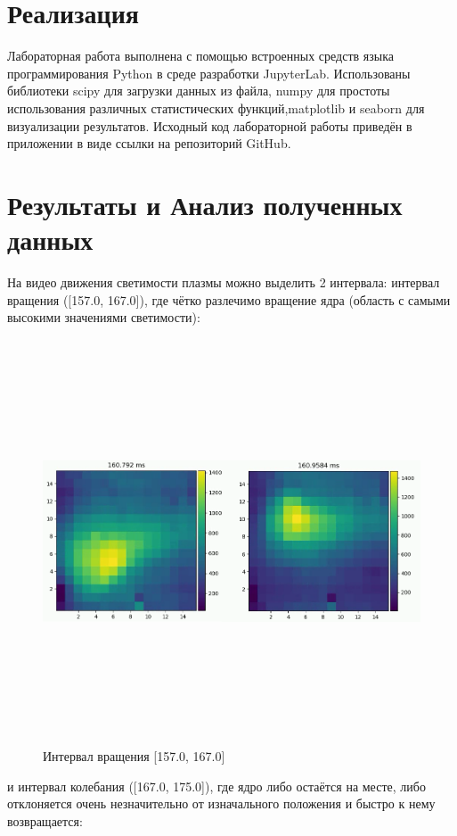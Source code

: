\documentclass[a4paper,12pt]{article} %
\begin{document}
	\section{Реализация}
	Лабораторная работа выполнена с помощью встроенных средств языка программирования Python в среде разработки JupyterLab. Использованы библиотеки scipy для загрузки данных из файла, numpy для простоты использования различных статистических функций,matplotlib и seaborn для визуализации результатов.
	Исходный код лабораторной работы приведён в приложении в виде ссылки на репозиторий GitHub.
	\section{Результаты и Анализ полученных данных}
	На видео движения светимости плазмы можно выделить 2 интервала: интервал вращения ([157.0, 167.0]), где чётко разлечимо вращение ядра (область с самыми высокими значениями светимости):
	\begin{figure}[H]
		\centering
		\includegraphics[width = 18cm, height = 12cm]{Rot_prj.png}
		\caption{Интервал вращения [157.0, 167.0]}
		\label{fig:rot_prj}
	\end{figure}
	и интервал колебания ([167.0, 175.0]), где ядро либо остаётся на месте, либо отклоняется очень незначительно от изначального положения и быстро к нему возвращается:
\end{document}
